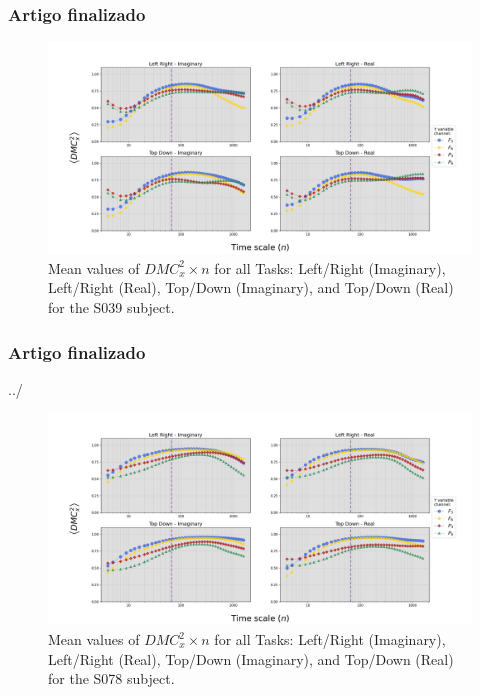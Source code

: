 \documentclass[11pt, aspectratio=169]{beamer}
\begin{document}
  \begin{frame}
    \frametitle{Artigo finalizado}
  
\begin{figure}[!h]
	\includegraphics[height=.5\paperheight]{../Figures/art_02/Fig5.jpg}
	\caption{Mean values of $DMC_{x}^{2} \times n$ for all Tasks: Left/Right (Imaginary), Left/Right (Real), Top/Down (Imaginary), and Top/Down (Real) for the S039 subject.}
	\label{fig05}
\end{figure}
  \end{frame}


  \begin{frame}
    \frametitle{Artigo finalizado}
  ../
\begin{figure}[!h]
	\includegraphics[height=.5\paperheight]{../Figures/art_02/Fig6.jpg}
	\caption{Mean values of $DMC_{x}^{2} \times n$ for all Tasks: Left/Right (Imaginary), Left/Right (Real), Top/Down (Imaginary), and Top/Down (Real) for the S078 subject.}
	\label{fig06}
\end{figure}
  \end{frame}
\end{document}
